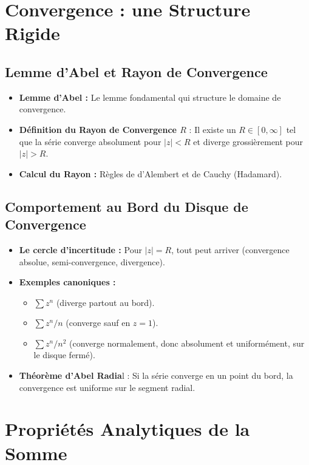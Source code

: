 \documentclass[12pt, a4paper, parskip=full]{report}
\theoremstyle{agregstyle}
\begin{document}
\section{Convergence : une Structure Rigide}
\subsection{Lemme d'Abel et Rayon de Convergence}
\begin{itemize}
    \item \textbf{Lemme d'Abel :} Le lemme fondamental qui structure le domaine de convergence.
    \item \textbf{Définition du Rayon de Convergence $R$} : Il existe un $R \in [0, \infty]$ tel que la série converge absolument pour $|z|<R$ et diverge grossièrement pour $|z|>R$.
    \item \textbf{Calcul du Rayon :} Règles de d'Alembert et de Cauchy (Hadamard).
\end{itemize}
\subsection{Comportement au Bord du Disque de Convergence}
\begin{itemize}
    \item \textbf{Le cercle d'incertitude :} Pour $|z|=R$, tout peut arriver (convergence absolue, semi-convergence, divergence).
    \item \textbf{Exemples canoniques :}
        \begin{itemize}
            \item $\sum z^n$ (diverge partout au bord).
            \item $\sum z^n/n$ (converge sauf en $z=1$).
            \item $\sum z^n/n^2$ (converge normalement, donc absolument et uniformément, sur le disque fermé).
        \end{itemize}
    \item \textbf{Théorème d'Abel Radia}l : Si la série converge en un point du bord, la convergence est uniforme sur le segment radial.
\end{itemize}

\section{Propriétés Analytiques de la Somme}
\end{document}
